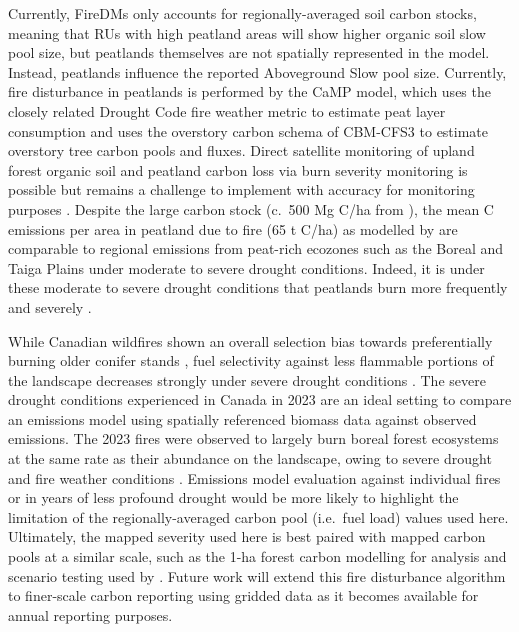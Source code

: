\documentclass[, manuscript]{copernicus}
\begin{document}
Currently, FireDMs only accounts for regionally-averaged soil carbon
stocks, meaning that RUs with high peatland areas will show higher
organic soil slow pool size, but peatlands themselves are not spatially
represented in the model. Instead, peatlands influence the reported
Aboveground Slow pool size. Currently, fire disturbance in peatlands is
performed by the CaMP model, which uses the closely related Drought Code
fire weather metric to estimate peat layer consumption \citep{bona2020}
and uses the overstory carbon schema of CBM-CFS3 to estimate overstory
tree carbon pools and fluxes. Direct satellite monitoring of upland
forest organic soil and peatland carbon loss via burn severity
monitoring is possible but remains a challenge to implement with
accuracy for monitoring purposes \citep{bourgeau-chavez2020}. Despite
the large carbon stock (c.~500 Mg C/ha from
\citet{beilmanPeatCarbonStocks2008}), the mean C emissions per area in
peatland due to fire (65 t C/ha) as modelled by \citet{bona2024} are
comparable to regional emissions from peat-rich ecozones such as the
Boreal and Taiga Plains under moderate to severe drought conditions.
Indeed, it is under these moderate to severe drought conditions that
peatlands burn more frequently \citep{turetsky2004, thompson2019} and
severely \citep{kuntzemann2023}.

While Canadian wildfires shown an overall selection bias towards
preferentially burning older conifer stands \citep{bernier2016}, fuel
selectivity against less flammable portions of the landscape decreases
strongly under severe drought conditions \citep{parks2018}. The severe
drought conditions experienced in Canada in 2023
\citep{jainDriversImpactsRecordBreaking2024} are an ideal setting to
compare an emissions model using spatially referenced biomass data
against observed emissions. The 2023 fires were observed to largely burn
boreal forest ecosystems at the same rate as their abundance on the
landscape, owing to severe drought and fire weather conditions
\citep{boulanger2024}. Emissions model evaluation against individual
fires or in years of less profound drought would be more likely to
highlight the limitation of the regionally-averaged carbon pool
(i.e.~fuel load) values used here. Ultimately, the mapped severity used
here is best paired with mapped carbon pools at a similar scale, such as
the 1-ha forest carbon modelling for analysis and scenario testing used
by \citet{smyth2024}. Future work will extend this fire disturbance
algorithm to finer-scale carbon reporting using gridded data as it
becomes available for annual reporting purposes.
\end{document}
